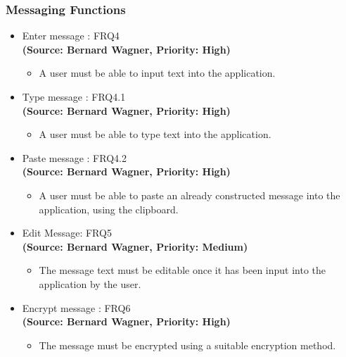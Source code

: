 \subsubsection{Messaging Functions}
\begin{itemize}
\item{Enter message : FRQ4}\\%
\textbf{(Source: Bernard Wagner, Priority: High)}
\begin{itemize}
\item A user must be able to input text into the application.
\end{itemize}
\item{Type message : FRQ4.1}\\
\textbf{(Source: Bernard Wagner, Priority: High)}
\begin{itemize}
\item A user must be able to type text into the application.
\end{itemize}
\item{Paste message : FRQ4.2}\\
\textbf{(Source: Bernard Wagner, Priority: High)}
\begin{itemize}
\item A user must be able to paste an already constructed message into the application, using the clipboard.
\end{itemize}
\item{Edit Message: FRQ5}\\
\textbf{(Source: Bernard Wagner, Priority: Medium)}
\begin{itemize}
\item The message text must be editable once it has been input into the application by the user.
\end{itemize}
\item{Encrypt message : FRQ6}\\
\textbf{(Source: Bernard Wagner, Priority: High)}
\begin{itemize}
\item The message must be encrypted using a suitable encryption method.
\end{itemize}

\end{itemize}
